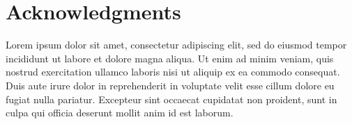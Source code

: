 \documentclass{sigchi}
\begin{document}
\section{Acknowledgments}
Lorem ipsum dolor sit amet, consectetur adipiscing elit, sed do eiusmod tempor incididunt ut labore et dolore magna aliqua. Ut enim ad minim veniam, quis nostrud exercitation ullamco laboris nisi ut aliquip ex ea commodo consequat. Duis aute irure dolor in reprehenderit in voluptate velit esse cillum dolore eu fugiat nulla pariatur. Excepteur sint occaecat cupidatat non proident, sunt in culpa qui officia deserunt mollit anim id est laborum.

%
%
%
%
%
\balance{}



\end{document}
